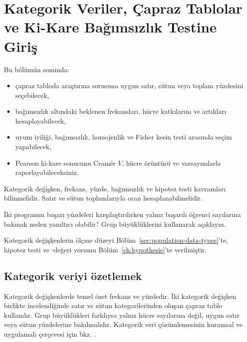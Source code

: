 \chapter{Kategorik Veriler, Çapraz Tablolar ve Ki-Kare Bağımsızlık Testine Giriş}
\label{ch:categorical}

\begin{hedefler}
Bu bölümün sonunda:
\begin{itemize}
  \item çapraz tabloda araştırma sorusuna uygun satır, sütun veya toplam yüzdesini seçebilecek,
  \item bağımsızlık altındaki beklenen frekansları, hücre katkılarını ve artıkları hesaplayabilecek,
  \item uyum iyiliği, bağımsızlık, homojenlik ve Fisher kesin testi arasında seçim yapabilecek,
  \item Pearson ki-kare sonucunu Cramér $V$, hücre örüntüsü ve varsayımlarla raporlayabileceksiniz.
\end{itemize}
\end{hedefler}

\begin{prerequisitebox}
Kategorik değişken, frekans, yüzde, bağımsızlık ve hipotez testi kavramları
bilinmelidir. Satır ve sütun toplamlarıyla oran hesaplanabilmelidir.
\end{prerequisitebox}

\begin{hazirlik}
İki programın başarı yüzdeleri karşılaştırılırken yalnız başarılı öğrenci
sayılarına bakmak neden yanıltıcı olabilir? Grup büyüklüklerini kullanarak
açıklayın.
\end{hazirlik}

Kategorik değişkenlerin ölçme düzeyi Bölüm~\ref{sec:population-data-types}'te,
hipotez testi ve \pval-değeri yorumu Bölüm~\ref{ch:hypothesis}'te verilmiştir.

\section{Kategorik veriyi özetlemek}

Kategorik değişkenlerde temel özet frekans ve yüzdedir. İki kategorik
değişken birlikte incelendiğinde satır ve sütun kategorilerinden oluşan çapraz
tablo kullanılır. Grup büyüklükleri farklıysa yalnız hücre sayılarına değil,
uygun satır veya sütun yüzdelerine bakılmalıdır. Kategorik veri çözümlemesinin
kuramsal ve uygulamalı çerçevesi için bkz. \citet{agresti2019}.

